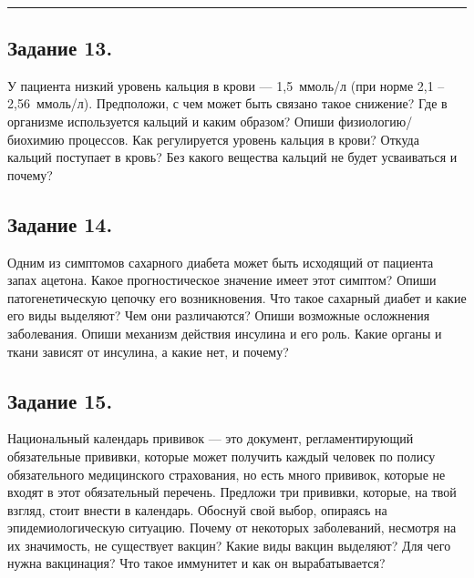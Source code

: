 \\
\rule[0.5\baselineskip]{\textwidth}{1pt}

\vspace{0\baselineskip}

\subsection*{Задание 13.}
У пациента низкий уровень кальция в крови — 1,5~ммоль/л (при норме 2,1 – 2,56~ммоль/л). Предположи, с чем может быть связано такое снижение? Где в организме используется кальций и каким образом? Опиши физиологию/биохимию процессов. Как регулируется уровень кальция в крови? Откуда кальций поступает в кровь? Без какого вещества кальций не будет усваиваться и почему?

\subsection*{Задание 14.}
Одним из симптомов сахарного диабета может быть исходящий от пациента запах ацетона. Какое прогностическое значение имеет этот симптом? Опиши патогенетическую цепочку его возникновения. Что такое сахарный диабет и какие его виды выделяют? Чем они различаются? Опиши возможные осложнения заболевания. Опиши механизм действия инсулина и его роль. Какие органы и ткани зависят от инсулина, а какие нет, и почему? 

\subsection*{Задание 15.}
Национальный календарь прививок — это документ, регламентирующий обязательные прививки, которые может получить каждый человек по полису обязательного медицинского страхования, но есть много прививок, которые не входят в этот обязательный перечень. Предложи три прививки, которые, на твой взгляд, стоит внести в календарь. Обоснуй свой выбор, опираясь на эпидемиологическую ситуацию. Почему от некоторых заболеваний, несмотря на их значимость, не существует вакцин? Какие виды вакцин выделяют? Для чего нужна вакцинация? Что такое иммунитет и как он вырабатывается?
